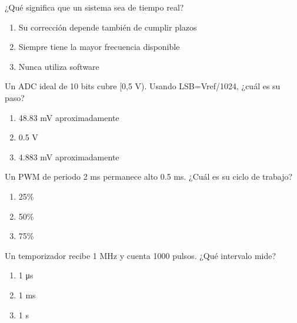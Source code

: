 \noindent\begin{minipage}{\linewidth}\setlength{\parskip}{4pt}\label{q:H-052}
¿Qué significa que un sistema sea de tiempo real?
\begin{enumerate}[label=\Alph*),nosep]
\item Su corrección depende también de cumplir plazos
\item Siempre tiene la mayor frecuencia disponible
\item Nunca utiliza software
\end{enumerate}\end{minipage}\par\medskip

\noindent\begin{minipage}{\linewidth}\setlength{\parskip}{4pt}\label{q:H-053}
Un ADC ideal de 10 bits cubre [0,5 V). Usando LSB=Vref/1024, ¿cuál es su paso?
\begin{enumerate}[label=\Alph*),nosep]
\item 48.83 mV aproximadamente
\item 0.5 V
\item 4.883 mV aproximadamente
\end{enumerate}\end{minipage}\par\medskip

\noindent\begin{minipage}{\linewidth}\setlength{\parskip}{4pt}\label{q:H-054}
Un PWM de periodo 2 ms permanece alto 0.5 ms. ¿Cuál es su ciclo de trabajo?
\begin{enumerate}[label=\Alph*),nosep]
\item 25\%
\item 50\%
\item 75\%
\end{enumerate}\end{minipage}\par\medskip

\noindent\begin{minipage}{\linewidth}\setlength{\parskip}{4pt}\label{q:H-055}
Un temporizador recibe 1 MHz y cuenta 1000 pulsos. ¿Qué intervalo mide?
\begin{enumerate}[label=\Alph*),nosep]
\item 1 μs
\item 1 ms
\item 1 s
\end{enumerate}\end{minipage}\par\medskip

